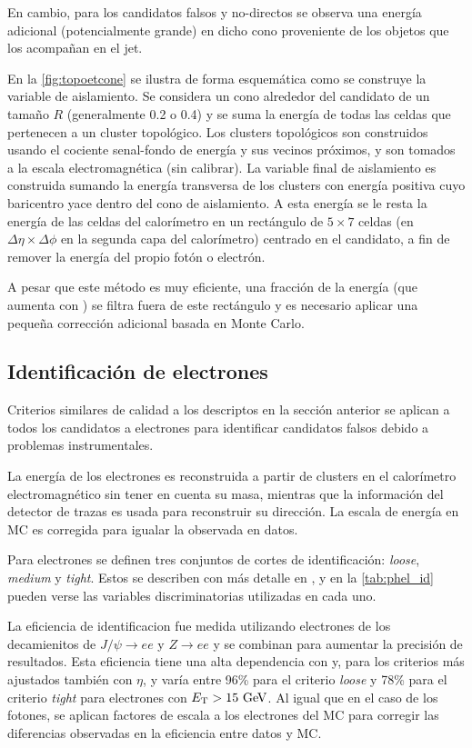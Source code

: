 En cambio, para los candidatos falsos y no-directos se observa una energía adicional
(potencialmente grande) en dicho cono proveniente de los objetos que los acompañan en el jet.

En la \cref{fig:topoetcone} se ilustra de forma esquemática como se construye
la variable de aislamiento. Se considera un cono alrededor del candidato
de un tamaño $R$ (generalmente 0.2 o 0.4) y se suma la energía de todas las
celdas que pertenecen a un cluster topológico. Los clusters topológicos son
construidos usando el cociente senal-fondo de energía y sus vecinos próximos,
y son tomados a la escala electromagnética (sin calibrar). La variable final de
aislamiento es construida sumando la energía transversa de los clusters con
energía positiva cuyo baricentro yace dentro del cono de aislamiento. A esta
energía se le resta la energía de las celdas del calorímetro en un rectángulo de
$5\times 7$ celdas (en $\Delta\eta \times \Delta\phi$ en la segunda capa del
calorímetro) centrado en el candidato, a fin de remover la energía del propio
fotón o electrón.

A pesar que este método es muy eficiente, una fracción de la energía (que aumenta con {\pt}) se filtra fuera de
este rectángulo y es necesario aplicar una peque\~na corrección adicional
basada en Monte Carlo.


\subsection{Identificación de electrones}
\label{sec:elec_obj}

Criterios similares de calidad a los descriptos en la sección anterior
se aplican a todos los candidatos a electrones para identificar candidatos
falsos debido a problemas instrumentales.

La energía de los electrones es reconstruida a partir de clusters en el calorímetro
electromagnético sin tener en cuenta su masa, mientras que la información del
detector de trazas es usada para reconstruir su dirección. La escala de energía
en MC es corregida para igualar la observada en datos.

Para electrones se definen tres conjuntos de cortes de identificación: \emph{loose}, \emph{medium} y
\emph{tight}. Estos se describen con más detalle en \cite{ATL-PHYS-PUB-2011-007}, y
en la \cref{tab:phel_id} pueden verse las variables discriminatorias utilizadas
en cada uno.

La eficiencia de identificacion fue medida utilizando electrones de los
decamienitos de $J/\psi\to ee$ y $Z\to ee$ y se combinan para aumentar la
precisión de resultados. Esta eficiencia tiene una alta dependencia con {\et} y, para
los criterios más ajustados también con $\eta$, y varía entre 96\% para el criterio
\emph{loose} y 78\% para el criterio \emph{tight} para electrones con $\et>15\gev$.
Al igual que en el caso de los fotones, se aplican factores de escala
a los electrones del MC para corregir las diferencias observadas en la
eficiencia entre datos y MC.


